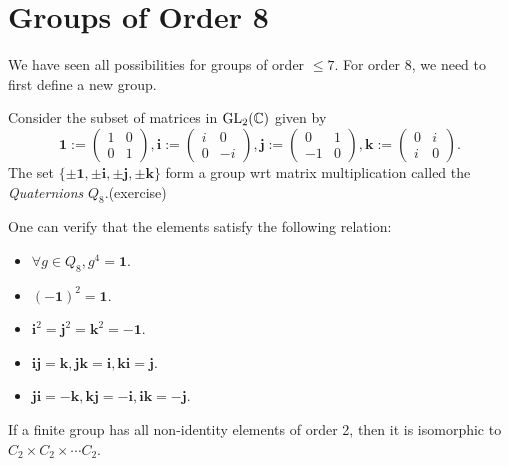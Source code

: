 \documentclass[10pt]{article}
\def\le{\leqslant}
\begin{document}
    \section{Groups of Order 8}
    We have seen all possibilities for groups of order $\le 7$. For order 8, we need to first define a new group.
    \begin{definition}
        Consider the subset of matrices in $ \mathrm{GL}_2({\mathbb{C}}) $ given by
        \[
            \mathbf{1}:=\begin{pmatrix}
                1&0\\
                0&1
            \end{pmatrix},
            \mathbf{i}:= \begin{pmatrix}
                i&0\\
                0&-i
            \end{pmatrix},
            \mathbf{j}:=\begin{pmatrix}
                0&1\\
                -1&0
            \end{pmatrix},
            \mathbf{k}:= \begin{pmatrix}
                0&i\\
                i&0
            \end{pmatrix}.
        \]
        The set $ \{\pm \mathbf{1},\pm \mathbf{i},\pm \mathbf{j},\pm \mathbf{k}\} $ form a group wrt matrix multiplication called the \textit{Quaternions} $ Q_8 $.(exercise)
    \end{definition}
    One can verify that the elements satisfy the following relation:
    \begin{itemize}
        \item $ \forall g\in Q_8, g^4=\mathbf{1} $.
        \item $ (-\mathbf{1})^2=\mathbf{1} $.
        \item $ \mathbf{i}^2=\mathbf{j}^2=\mathbf{k}^2=-\mathbf{1} $.
        \item $ \mathbf{i}\mathbf{j}=\mathbf{k},\mathbf{j}\mathbf{k}=\mathbf{i},\mathbf{k}\mathbf{i}=\mathbf{j} $.
        \item $ \mathbf{j}\mathbf{i}=-\mathbf{k}, \mathbf{k}\mathbf{j}=-\mathbf{i}, \mathbf{i}\mathbf{k}=-\mathbf{j}$.
    \end{itemize}
    \begin{lemma}\label{lma:8.2}
        If a finite group has all non-identity elements of order 2, then it is isomorphic to $ C_2 \times C_2 \times \cdots C_2 $.
    \end{lemma}
\end{document}
